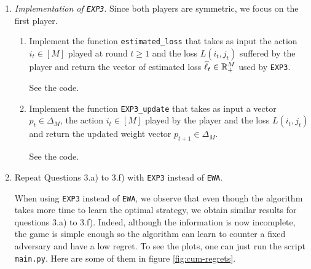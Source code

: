 \begin{enumerate}[resume]
    \item \emph{Implementation of \lstinline{EXP3}}. Since both players are symmetric, we focus on the first player. 
    \begin{enumerate}[label=(\alph*)]
    	\item Implement the function \lstinline{estimated_loss} that takes as input the action $i_t \in [M]$ played at round $t\geq 1$ and the loss $L(i_t,j_t)$ suffered by the player and return the vector of estimated loss $\widehat \ell_t \in \mathbb{R}_+^M$ used by \lstinline{EXP3}.
	
	    \begin{solution}
    See the code.
        \end{solution}
	
	
	    \item Implement the function \lstinline{EXP3_update} that takes as input a vector $p_t \in \Delta_M$, the action $i_t \in [M]$ played by the player and the loss $L(i_t,j_t)$ and return the updated weight vector $p_{t+1} \in \Delta_M$.
	    
	    \begin{solution}
    See the code.
        \end{solution}
    \end{enumerate}

    \item Repeat Questions 3.a) to 3.f) with \lstinline{EXP3} instead of \lstinline{EWA}.
    
    \begin{solution}
    When using \lstinline{EXP3} instead of \lstinline{EWA}, we observe that even though the algorithm takes more time to learn the optimal strategy, we obtain similar results for questions 3.a) to 3.f). Indeed, although the information is now incomplete, the game is simple enough so the algorithm can learn to counter a fixed adversary and have a low regret. To see the plots, one can just run the script \lstinline{main.py}. Here are some of them in figure \ref{fig:cum-regrets}.
    

\end{solution}
\end{enumerate}

